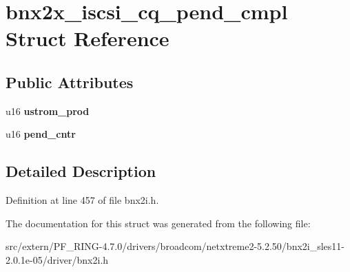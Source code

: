 \hypertarget{structbnx2x__iscsi__cq__pend__cmpl}{
\section{bnx2x\_\-iscsi\_\-cq\_\-pend\_\-cmpl Struct Reference}
\label{structbnx2x__iscsi__cq__pend__cmpl}
}
\subsection*{Public Attributes}
\begin{DoxyCompactItemize}
\item 
\hypertarget{structbnx2x__iscsi__cq__pend__cmpl_ab764c5a23fa02368676e8049e2e15a96}{
u16 {\bfseries ustrom\_\-prod}}
\label{structbnx2x__iscsi__cq__pend__cmpl_ab764c5a23fa02368676e8049e2e15a96}

\item 
\hypertarget{structbnx2x__iscsi__cq__pend__cmpl_afba1f6f8277bcbbfa65c116cab7cb251}{
u16 {\bfseries pend\_\-cntr}}
\label{structbnx2x__iscsi__cq__pend__cmpl_afba1f6f8277bcbbfa65c116cab7cb251}

\end{DoxyCompactItemize}


\subsection{Detailed Description}


Definition at line 457 of file bnx2i.h.



The documentation for this struct was generated from the following file:\begin{DoxyCompactItemize}
\item 
src/extern/PF\_\-RING-\/4.7.0/drivers/broadcom/netxtreme2-\/5.2.50/bnx2i\_\-sles11-\/2.0.1e-\/05/driver/bnx2i.h\end{DoxyCompactItemize}
